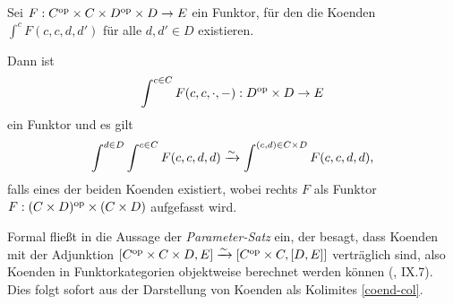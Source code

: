 \begin{lemma}
  \label{coend-fubini}
  Sei $F: C^\mathrm{op} \times C \times D^\mathrm{op} \times D \to E$ ein Funktor, für
  den die Koenden $\int^c F(c, c, d, d')$ für alle $d, d' \in D$
  existieren.

  Dann ist
  \[ \int^{c \in C} F(c, c, \cdot, -): D^\mathrm{op} \times D \to E \]
  ein Funktor und es gilt
  \[ \int^{d \in D} \int^{c \in C} F(c, c, d, d)
  \xrightarrow[]{\sim} \int^{(c, d) \in C \times D} F(c, c, d, d),
  \]
  falls eines der beiden Koenden existiert, wobei rechts $F$ als
  Funktor $F: (C \times D)^\mathrm{op} \times (C \times D)$ aufgefasst wird.
\end{lemma}
\begin{bem}
  Formal fließt in die Aussage der \emph{Parameter-Satz} ein, der
  besagt, dass Koenden mit der Adjunktion $[C^\mathrm{op} \times C \times D, E]
  \xrightarrow[]{\sim} {[C^\mathrm{op} \times C, [D, E]]}$ verträglich sind, also Koenden in
  Funktorkategorien objektweise berechnet werden können (\cite{ML},
  IX.7). Dies folgt sofort aus der Darstellung von Koenden als
  Kolimites \ref{coend-col}.
\end{bem}
